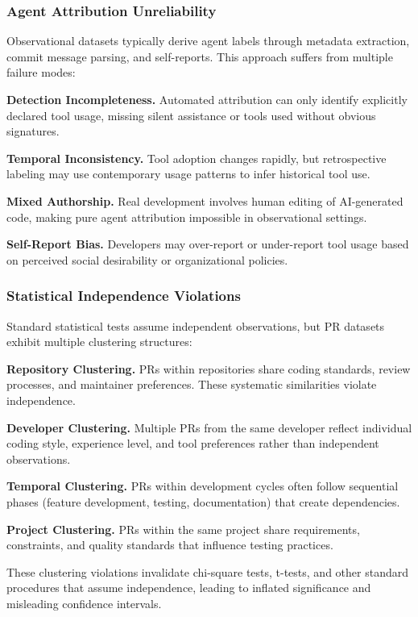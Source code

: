 \documentclass[conference]{IEEEtran}
\begin{document}
\subsubsection{Agent Attribution Unreliability}

Observational datasets typically derive agent labels through metadata extraction, commit message parsing, and self-reports. This approach suffers from multiple failure modes:

\textbf{Detection Incompleteness.} Automated attribution can only identify explicitly declared tool usage, missing silent assistance or tools used without obvious signatures.

\textbf{Temporal Inconsistency.} Tool adoption changes rapidly, but retrospective labeling may use contemporary usage patterns to infer historical tool use.

\textbf{Mixed Authorship.} Real development involves human editing of AI-generated code, making pure agent attribution impossible in observational settings.

\textbf{Self-Report Bias.} Developers may over-report or under-report tool usage based on perceived social desirability or organizational policies.

\subsubsection{Statistical Independence Violations}

Standard statistical tests assume independent observations, but PR datasets exhibit multiple clustering structures:

\textbf{Repository Clustering.} PRs within repositories share coding standards, review processes, and maintainer preferences. These systematic similarities violate independence.

\textbf{Developer Clustering.} Multiple PRs from the same developer reflect individual coding style, experience level, and tool preferences rather than independent observations.

\textbf{Temporal Clustering.} PRs within development cycles often follow sequential phases (feature development, testing, documentation) that create dependencies.

\textbf{Project Clustering.} PRs within the same project share requirements, constraints, and quality standards that influence testing practices.

These clustering violations invalidate chi-square tests, t-tests, and other standard procedures that assume independence, leading to inflated significance and misleading confidence intervals.
\end{document}
